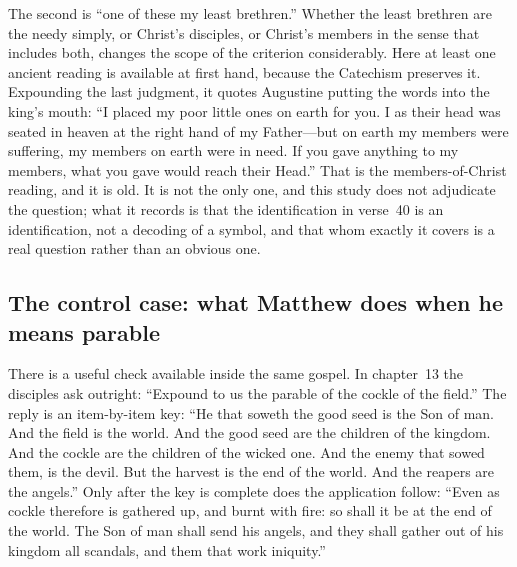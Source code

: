 The second is ``one of these my least brethren.'' Whether the least brethren are the needy simply, or Christ's disciples, or Christ's members in the sense that includes both, changes the scope of the criterion considerably. Here at least one ancient reading is available at first hand, because the Catechism preserves it. Expounding the last judgment, it quotes Augustine putting the words into the king's mouth: ``I placed my poor little ones on earth for you. I as their head was seated in heaven at the right hand of my Father---but on earth my members were suffering, my members on earth were in need. If you gave anything to my members, what you gave would reach their Head.'' That is the members-of-Christ reading, and it is old. It is not the only one, and this study does not adjudicate the question; what it records is that the identification in verse~40 is an identification, not a decoding of a symbol, and that whom exactly it covers is a real question rather than an obvious one.

\subsection{The control case: what Matthew does when he means parable}

There is a useful check available inside the same gospel. In chapter~13 the disciples ask outright: ``Expound to us the parable of the cockle of the field.'' The reply is an item-by-item key: ``He that soweth the good seed is the Son of man. And the field is the world. And the good seed are the children of the kingdom. And the cockle are the children of the wicked one. And the enemy that sowed them, is the devil. But the harvest is the end of the world. And the reapers are the angels.'' Only after the key is complete does the application follow: ``Even as cockle therefore is gathered up, and burnt with fire: so shall it be at the end of the world. The Son of man shall send his angels, and they shall gather out of his kingdom all scandals, and them that work iniquity.''

